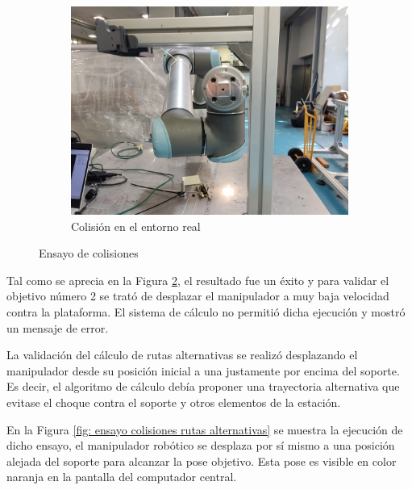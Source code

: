 \begin{figure}[h!]
\begin{subfigure}[h]{0.45\linewidth}
        \includegraphics[scale=0.09]{figuras/validacion colision real.jpeg}
        \caption{Colisión en el entorno real}
        \label{fig: validacion colision real}
    \end{subfigure}
    \caption{Ensayo de colisiones}
    \label{fig: ensayo colisones percha}
\end{figure}

Tal como se aprecia en la Figura \ref{fig: ensayo colisones percha}, el resultado fue un éxito y para validar el objetivo número 2 se trató de desplazar el manipulador a muy baja velocidad contra la plataforma. El sistema de cálculo no permitió dicha ejecución y mostró un mensaje de error.

La validación del cálculo de rutas alternativas se realizó desplazando el manipulador desde su posición inicial a una justamente por encima del soporte. Es decir, el algoritmo de cálculo debía proponer una trayectoria alternativa que evitase el choque contra el soporte y otros elementos de la estación. 

En la Figura \ref{fig: ensayo colisiones rutas alternativas} se muestra la ejecución de dicho ensayo, el manipulador robótico se desplaza por sí mismo a una posición alejada del soporte para alcanzar la pose objetivo. Esta pose es visible en color naranja en la pantalla del computador central.


